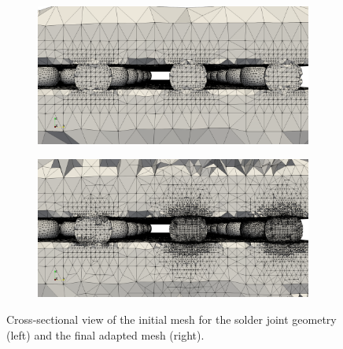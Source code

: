 \begin{figure}[ht!]
\centering
\begin{subfigure}{.5\textwidth}
\centering
\includegraphics[width=.99\linewidth]{img/aut_solder_mesh_initial.png}
\end{subfigure}%
\begin{subfigure}{0.5\textwidth}
\centering
\includegraphics[width=.99\linewidth]{img/aut_solder_mesh_final.png}
\end{subfigure}%
\caption{Cross-sectional view of the initial mesh for the solder joint
geometry (left) and the final adapted mesh (right).}
\label{fig:aut_solder_mesh}
\end{figure}


